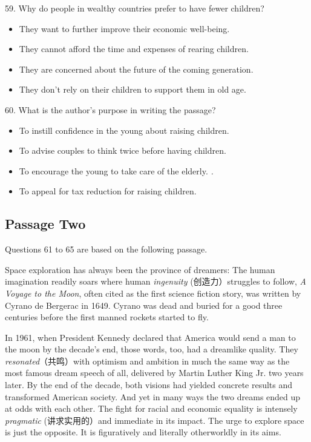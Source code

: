 \documentclass[UTF8,11pt]{ctexart}
\begin{document}
59. Why do people in wealthy countries prefer to have fewer children?


\begin{itemize}[leftmargin=2em,itemsep=.2em,topsep=.4em]\item[A.] They want to further improve their economic well-being.
\item[B.] They cannot afford the time and expenses of rearing children.
\item[C.] They are concerned about the future of the coming generation.
\item[D.] They don’t rely on their children to support them in old age.
\end{itemize}

60. What is the author’s purpose in writing the passage?


\begin{itemize}[leftmargin=2em,itemsep=.2em,topsep=.4em]\item[A.] To instill confidence in the young about raising children.
\item[B.] To advise couples to think twice before having children.
\item[C.] To encourage the young to take care of the elderly. \textit{.}
\item[D.] To appeal for tax reduction for raising children.
\end{itemize}

\subsection*{Passage Two}


Questions 61 to 65 are based on the following passage.


Space exploration has always been the province of dreamers: The human imagination readily soars where human \textit{ingenuity} (创造力）struggles to follow,\textit{ A Voyage to the Moon}, often cited as the first science fiction story, was written by Cyrano de Bergerac in 1649. Cyrano was dead and buried for a good three centuries before the first manned rockets started to fly.


In 1961, when President Kennedy declared that America would send a man to the moon by the decade’s end, those words, too, had a dreamlike quality. They\textit{ resonated}（共鸣）with optimism and ambition in much the same way as the most famous dream speech of all, delivered by Martin Luther King Jr. two years later. By the end of the decade, both visions had yielded concrete results and transformed American society. And yet in many ways the two dreams ended up at odds with each other. The fight for racial and economic equality is intensely\textit{ pragmatic} (讲求实用的）and immediate in its impact. The urge to explore space is just the opposite. It is figuratively and literally otherworldly in its aims.
\end{document}
